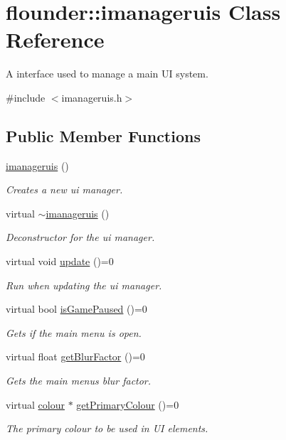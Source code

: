 \hypertarget{classflounder_1_1imanageruis}{}\section{flounder\+:\+:imanageruis Class Reference}
\label{classflounder_1_1imanageruis}


A interface used to manage a main UI system.  




{\ttfamily \#include $<$imanageruis.\+h$>$}

\subsection*{Public Member Functions}
\begin{DoxyCompactItemize}
\item 
\hyperlink{classflounder_1_1imanageruis_a11b6e709a8beb3a82f6febe132a7af1d}{imanageruis} ()
\begin{DoxyCompactList}\small\item\em Creates a new ui manager. \end{DoxyCompactList}\item 
virtual \hyperlink{classflounder_1_1imanageruis_adad4d9b86cea3db156f63e659faae623}{$\sim$imanageruis} ()
\begin{DoxyCompactList}\small\item\em Deconstructor for the ui manager. \end{DoxyCompactList}\item 
virtual void \hyperlink{classflounder_1_1imanageruis_a55a6b9eab0233c51c12b8819ba264b95}{update} ()=0
\begin{DoxyCompactList}\small\item\em Run when updating the ui manager. \end{DoxyCompactList}\item 
virtual bool \hyperlink{classflounder_1_1imanageruis_ad79a86978a96901e62ced2e0e0f09af3}{is\+Game\+Paused} ()=0
\begin{DoxyCompactList}\small\item\em Gets if the main menu is open. \end{DoxyCompactList}\item 
virtual float \hyperlink{classflounder_1_1imanageruis_a8acc9382f12a79893306145138034871}{get\+Blur\+Factor} ()=0
\begin{DoxyCompactList}\small\item\em Gets the main menu\textquotesingle{}s blur factor. \end{DoxyCompactList}\item 
virtual \hyperlink{classflounder_1_1colour}{colour} $\ast$ \hyperlink{classflounder_1_1imanageruis_add2f4d36a50adc177088f3a56c23a91a}{get\+Primary\+Colour} ()=0
\begin{DoxyCompactList}\small\item\em The primary colour to be used in UI elements. \end{DoxyCompactList}\end{DoxyCompactItemize}


